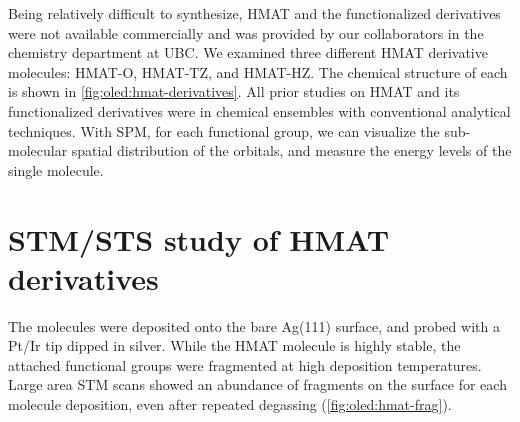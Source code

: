 \begin{figure} [h]
    \centering
    \caption{}
    \label{fig:oled:dft-hmat}
\end{figure}

Being relatively difficult to synthesize, \ac{HMAT} and the functionalized derivatives were not available commercially and was provided by our collaborators in the chemistry department at \ac{UBC}. We examined three different \ac{HMAT} derivative molecules: \ac{HMAT-O}, \ac{HMAT-TZ}, and \ac{HMAT-HZ}. The chemical structure of each is shown in \autoref{fig:oled:hmat-derivatives}. All prior studies on \ac{HMAT} and its functionalized derivatives were in chemical ensembles with conventional analytical techniques. With \ac{SPM}, for each functional group, we can visualize the sub-molecular spatial distribution of the orbitals, and measure the energy levels of the single molecule. 



\begin{figure} [h]
    \centering
    \caption{}
    \label{fig:oled:hmat-derivatives}
\end{figure}




\section{{STM}/{STS} study of HMAT derivatives}

The molecules were deposited onto the bare Ag(111) surface, and probed with a Pt/Ir tip dipped in silver. While the \ac{HMAT} molecule is highly stable, the attached functional groups were fragmented at high deposition temperatures. Large area \ac{STM} scans showed an abundance of fragments on the surface for each molecule deposition, even after repeated degassing (\autoref{fig:oled:hmat-frag}). 

